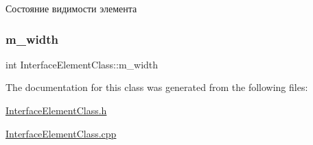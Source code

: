 Состояние видимости элемента 

\mbox{\label{class_interface_element_class_a0327b9790dee1416249b9cdedeb0154c}} 
\subsubsection{\texorpdfstring{m\+\_\+width}{m\_width}}
{\footnotesize\ttfamily int Interface\+Element\+Class\+::m\+\_\+width\hspace{0.3cm}{\ttfamily [protected]}}



The documentation for this class was generated from the following files\+:\begin{DoxyCompactItemize}
\item 
\hyperlink{_interface_element_class_8h}{Interface\+Element\+Class.\+h}\item 
\hyperlink{_interface_element_class_8cpp}{Interface\+Element\+Class.\+cpp}\end{DoxyCompactItemize}
